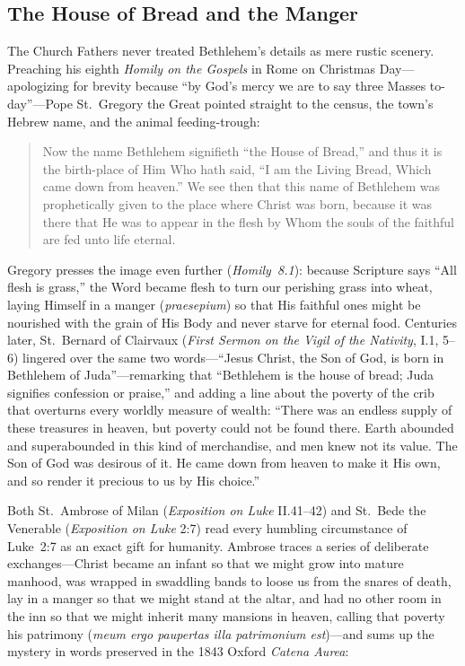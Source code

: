 \subsection{The House of Bread and the Manger}

The Church Fathers never treated Bethlehem's details as mere rustic scenery. Preaching his eighth \textit{Homily on the Gospels} in Rome on Christmas Day---apologizing for brevity because ``by God's mercy we are to say three Masses to-day''---Pope St.~Gregory the Great pointed straight to the census, the town's Hebrew name, and the animal feeding-trough:

\begin{quote}
Now the name Bethlehem signifieth ``the House of Bread,'' and thus it is the birth-place of Him Who hath said, ``I am the Living Bread, Which came down from heaven.'' We see then that this name of Bethlehem was prophetically given to the place where Christ was born, because it was there that He was to appear in the flesh by Whom the souls of the faithful are fed unto life eternal.
\end{quote}

Gregory presses the image even further (\textit{Homily~8.1}): because Scripture says ``All flesh is grass,'' the Word became flesh to turn our perishing grass into wheat, laying Himself in a manger (\textit{praesepium}) so that His faithful ones might be nourished with the grain of His Body and never starve for eternal food. Centuries later, St.~Bernard of Clairvaux (\textit{First Sermon on the Vigil of the Nativity}, I.1, 5--6) lingered over the same two words---``Jesus Christ, the Son of God, is born in Bethlehem of Juda''---remarking that ``Bethlehem is the house of bread; Juda signifies confession or praise,'' and adding a line about the poverty of the crib that overturns every worldly measure of wealth: ``There was an endless supply of these treasures in heaven, but poverty could not be found there. Earth abounded and superabounded in this kind of merchandise, and men knew not its value. The Son of God was desirous of it. He came down from heaven to make it His own, and so render it precious to us by His choice.''

Both St.~Ambrose of Milan (\textit{Exposition on Luke} II.41--42) and St.~Bede the Venerable (\textit{Exposition on Luke} 2:7) read every humbling circumstance of Luke~2:7 as an exact gift for humanity. Ambrose traces a series of deliberate exchanges---Christ became an infant so that we might grow into mature manhood, was wrapped in swaddling bands to loose us from the snares of death, lay in a manger so that we might stand at the altar, and had no other room in the inn so that we might inherit many mansions in heaven, calling that poverty his patrimony (\textit{meum ergo paupertas illa patrimonium est})---and sums up the mystery in words preserved in the 1843 Oxford \textit{Catena Aurea}:

